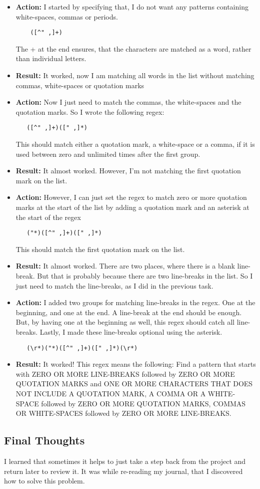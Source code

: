 \documentclass{article}
\begin{document}
\begin{itemize}
\item \textbf{Action:} I started by specifying that, I do not want any patterns containing white-spaces, commas or periods.
\begin{verbatim}
    ([^" ,]+)
\end{verbatim}
The + at the end ensures, that the characters are matched as a word, rather than individual letters. 
\item \textbf{Result:} It worked, now I am matching all words in the list without matching commas, white-spaces or quotation marks

\item \textbf{Action:} Now I just need to match the commas, the white-spaces and the quotation marks. So I wrote the following regex:
\begin{verbatim}
   ([^" ,]+)([" ,]*)
\end{verbatim}
This should match either a quotation mark, a white-space or a comma, if it is used between zero and unlimited times after the first group.
\item \textbf{Result:} It almost worked. However, I'm not matching the first quotation mark on the list. 

\item \textbf{Action:} However, I can just set the regex to match zero or more quotation marks at the start of the list by adding a quotation mark and an asterisk at the start of the regex
\begin{verbatim}
   ("*)([^" ,]+)([" ,]*)
\end{verbatim}
This should match the first quotation mark on the list.
\item \textbf{Result:} It almost worked. There are two places, where there is a blank line-break. But that is probably because there are two line-breaks in the list. So I just need to match the line-breaks, as I did in the previous task.

\item \textbf{Action:} I added two groups for matching line-breaks in the regex. One at the beginning, and one at the end. A line-break at the end should be enough. But, by having one at the beginning as well, this regex should catch all line-breaks. Lastly, I made these line-breaks optional using the asterisk.
\begin{verbatim}
   (\r*)("*)([^" ,]+)([" ,]*)(\r*)
\end{verbatim}
\item \textbf{Result:} It worked! This regex means the following: Find a pattern that starts with ZERO OR MORE LINE-BREAKS followed by ZERO OR MORE QUOTATION MARKS and ONE OR MORE CHARACTERS THAT DOES NOT INCLUDE A QUOTATION MARK, A COMMA OR A WHITE-SPACE followed by ZERO OR MORE QUOTATION MARKS, COMMAS OR WHITE-SPACES followed by ZERO OR MORE LINE-BREAKS.  

\end{itemize}
\subsection{Final Thoughts}
I learned that sometimes it helps to just take a step back from the project and return later to review it. It was while re-reading my journal, that I discovered how to solve this problem.  
\pagebreak{}



\end{document}
